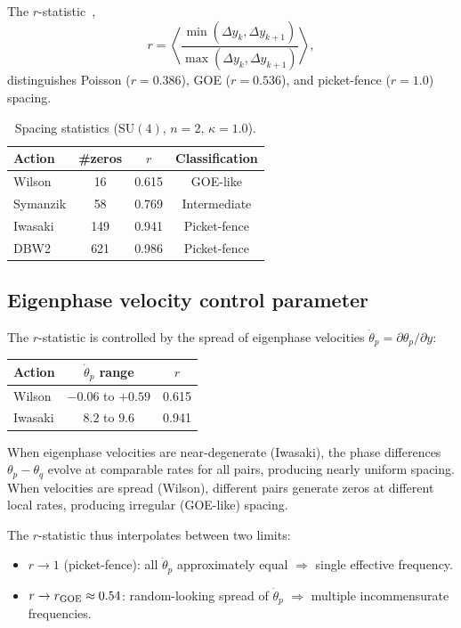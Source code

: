 \documentclass[12pt]{article}
\theoremstyle{definition}
\theoremstyle{remark}
\newcommand{\SU}{\mathrm{SU}}
\begin{document}
The $r$-statistic~\cite{OganesyanHuse2007},
\begin{equation}
r = \left\langle
\frac{\min(\Delta y_k, \Delta y_{k+1})}{\max(\Delta y_k, \Delta y_{k+1})}
\right\rangle,
\end{equation}
distinguishes Poisson ($r = 0.386$), GOE ($r = 0.536$), and
picket-fence ($r = 1.0$) spacing.

\begin{table}[h]
\centering
\caption{Spacing statistics ($\SU(4)$, $n = 2$, $\kappa = 1.0$).}
\label{tab:rstats}
\begin{tabular}{lccc}
\toprule
Action & \#zeros & $r$ & Classification \\
\midrule
Wilson   & 16  & 0.615 & GOE-like \\
Symanzik & 58  & 0.769 & Intermediate \\
Iwasaki  & 149 & 0.941 & Picket-fence \\
DBW2     & 621 & 0.986 & Picket-fence \\
\bottomrule
\end{tabular}
\end{table}

\subsection{Eigenphase velocity control parameter}

The $r$-statistic is controlled by the spread of eigenphase velocities
$\dot\theta_p = \partial\theta_p/\partial y$:

\begin{center}
\begin{tabular}{lcc}
\toprule
Action & $\dot\theta_p$ range & $r$ \\
\midrule
Wilson & $-0.06$ to $+0.59$ & 0.615 \\
Iwasaki & $8.2$ to $9.6$ & 0.941 \\
\bottomrule
\end{tabular}
\end{center}

When eigenphase velocities are near-degenerate (Iwasaki), the
phase differences $\theta_p - \theta_q$ evolve at comparable rates
for all pairs, producing nearly uniform spacing.  When velocities
are spread (Wilson), different pairs generate zeros at different
local rates, producing irregular (GOE-like) spacing.

The $r$-statistic thus interpolates between two limits:
\begin{itemize}
\item $r \to 1$ (picket-fence): all $\dot\theta_p$ approximately
  equal $\Rightarrow$ single effective frequency.
\item $r \to r_{\rm GOE} \approx 0.54$: random-looking spread of
  $\dot\theta_p$ $\Rightarrow$ multiple incommensurate frequencies.
\end{itemize}
\end{document}
